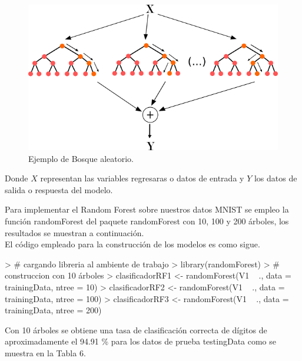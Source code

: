 \documentclass{article}
\begin{document}
\begin{figure}[H]
    \centering
	\includegraphics[scale=0.5]{figure/bosques1.png}
	\caption{Ejemplo de Bosque aleatorio.}
\end{figure}

Donde $X$ representan las variables regresaras o datos de entrada y $Y$ los datos de salida o respuesta del modelo.

Para implementar el Random Forest sobre nuestros datos MNIST se empleo la función randomForest del paquete randomForest con 10, 100 y 200 árboles, los resultados se muestran a continuación.\\

El código empleado para la construcción de los modelos es como sigue. 
\begin{Schunk}
\begin{Sinput}
> # cargando libreria al ambiente de trabajo
> library(randomForest)
> # construccion con 10 árboles
> clasificadorRF1 <- randomForest(V1 ~ ., data = trainingData, ntree = 10)
> clasificadorRF2 <- randomForest(V1 ~ ., data = trainingData, ntree = 100)
> clasificadorRF3 <- randomForest(V1 ~ ., data = trainingData, ntree = 200)
\end{Sinput}
\end{Schunk}


Con 10 árboles se obtiene una tasa de clasificación correcta de dígitos de aproximadamente el 94.91 \% para los datos de prueba testingData como se  muestra en la Tabla 6.
\end{document}
